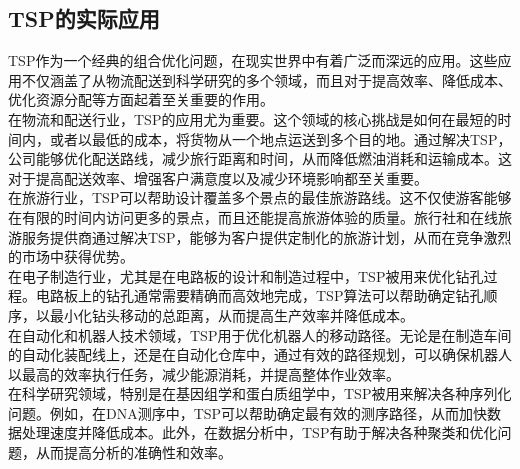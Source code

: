 \documentclass{NauThesis}
\begin{document}
\subsection{TSP的实际应用}
TSP作为一个经典的组合优化问题，在现实世界中有着广泛而深远的应用。这些应用不仅涵盖了从物流配送到科学研究的多个领域，而且对于提高效率、降低成本、优化资源分配等方面起着至关重要的作用。
\\\hspace*{2em}在物流和配送行业，TSP的应用尤为重要。这个领域的核心挑战是如何在最短的时间内，或者以最低的成本，将货物从一个地点运送到多个目的地。通过解决TSP，公司能够优化配送路线，减少旅行距离和时间，从而降低燃油消耗和运输成本。这对于提高配送效率、增强客户满意度以及减少环境影响都至关重要。
\\\hspace*{2em}在旅游行业，TSP可以帮助设计覆盖多个景点的最佳旅游路线。这不仅使游客能够在有限的时间内访问更多的景点，而且还能提高旅游体验的质量。旅行社和在线旅游服务提供商通过解决TSP，能够为客户提供定制化的旅游计划，从而在竞争激烈的市场中获得优势。
\\\hspace*{2em}在电子制造行业，尤其是在电路板的设计和制造过程中，TSP被用来优化钻孔过程。电路板上的钻孔通常需要精确而高效地完成，TSP算法可以帮助确定钻孔顺序，以最小化钻头移动的总距离，从而提高生产效率并降低成本。
\\\hspace*{2em}在自动化和机器人技术领域，TSP用于优化机器人的移动路径。无论是在制造车间的自动化装配线上，还是在自动化仓库中，通过有效的路径规划，可以确保机器人以最高的效率执行任务，减少能源消耗，并提高整体作业效率。
\\\hspace*{2em}在科学研究领域，特别是在基因组学和蛋白质组学中，TSP被用来解决各种序列化问题。例如，在DNA测序中，TSP可以帮助确定最有效的测序路径，从而加快数据处理速度并降低成本。此外，在数据分析中，TSP有助于解决各种聚类和优化问题，从而提高分析的准确性和效率。
\end{document}
